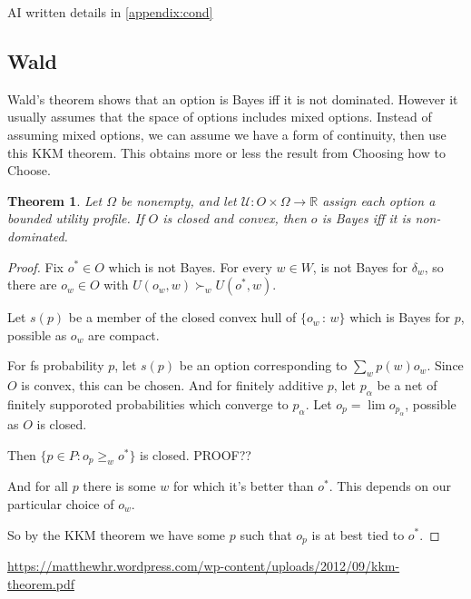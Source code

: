 \documentclass[11pt]{article}
\newtheorem{theorem}{Theorem}[section]
\theoremstyle{definition}
\theoremstyle{remark}
\newcommand{\U}{\mathcal U}
\newcommand{\given}{\,:\,}
\begin{document}
AI written details in \cref{appendix:cond}

\subsection{Wald}

Wald's theorem shows that an option is Bayes iff it is not dominated. However it usually assumes that the space of options includes mixed options. Instead of assuming mixed options, we can assume we have a form of continuity, then use this KKM theorem. This obtains more or less the result from Choosing how to Choose. 

\begin{theorem}
Let $\Omega$ be nonempty, and let
$\U\colon O\times\Omega\to\mathbb R$
assign each option a bounded utility profile.
If $O$ is closed and convex, then $o$ is Bayes iff it is non-dominated.
\end{theorem}
\begin{proof}
	Fix $o^*\in O$ which is not Bayes. For every $w\in W$, is not Bayes for $\delta_w$, so there are $o_w\in O$ with $U(o_w,w)\succ_w U(o^*,w)$. 
	
	Let $s(p)$ be a member of the closed convex hull of $\{o_w\given w\}$ which is Bayes for $p$, possible as $o_w$ are compact. 
	
	For fs probability $p$, let $s(p)$ be an option corresponding to $\sum_w p(w) o_w$. Since $O$ is convex, this can be chosen. And for finitely additive $p$, let $p_\alpha$ be a net of finitely supporoted probabilities which converge to $p_\alpha$. Let $o_p=\lim o_{p_\alpha}$, possible as $O$ is closed. 
	
	Then $\{p\in P: o_p\geq_w o^*\}$ is closed. PROOF??
	
	And for all $p$ there is some $w$ for which it's better than $o^*$. This depends on our particular choice of $o_w$. 
	
	So by the KKM theorem we have some $p$ such that $o_p$ is at best tied to $o^*$. 

\end{proof}
\url{https://matthewhr.wordpress.com/wp-content/uploads/2012/09/kkm-theorem.pdf}
\end{document}
